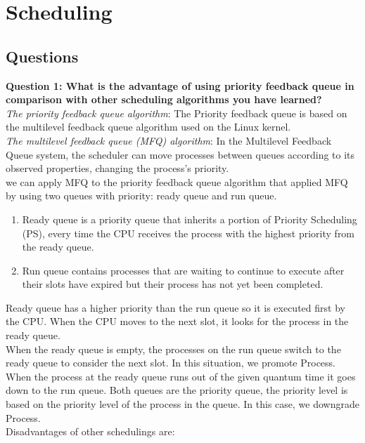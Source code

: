 \documentclass[13pt,a4paper]{article}
\begin{document}
	
	\newpage
	\tableofcontents
	\newpage
	\section{Scheduling}
		\subsection{Questions}
			\textbf{Question 1: What is the advantage of using priority feedback queue in comparison with other scheduling algorithms you have learned?} \\
			\textit{The priority feedback queue algorithm}: The Priority feedback queue is based on the multilevel feedback queue algorithm used on the Linux kernel. \\
			\textit{The multilevel feedback queue (MFQ) algorithm}: In the Multilevel Feedback Queue system, the scheduler can move processes between queues according to its observed properties, changing the process's priority. \\
			we can apply MFQ to the priority feedback queue algorithm that applied MFQ by using two queues with priority: ready queue and run queue.
			\begin{enumerate}[-]
				\item Ready queue is a priority queue that inherits a portion of Priority Scheduling (PS), every time the CPU receives the process with the highest priority from the ready queue.
				\item Run queue contains processes that are waiting to continue to execute after their slots have expired but their process has not yet been completed.
			\end{enumerate}
			Ready queue has a higher priority than the run queue so it is executed first by the CPU. When the CPU moves to the next slot, it looks for the process in the ready queue. \\
			When the ready queue is empty, the processes on the run queue switch to the ready queue to consider the next slot. In this situation, we promote Process. \\
			When the process at the ready queue runs out of the given quantum time it goes down to the run queue. Both queues are the priority queue, the priority level is based on the priority level of the process in the queue. In this case, we downgrade Process. \\
			Disadvantages of other schedulings are:
\end{document}
